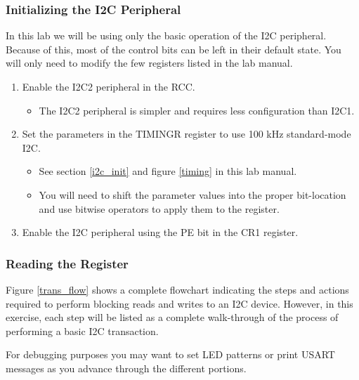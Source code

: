 \documentclass[11pt,fleqn]{book} %
\begin{document}
\subsubsection{Initializing the I2C Peripheral}
In this lab we will be using only the basic operation of the I2C peripheral. Because of this, most of the control bits can be left in their default state. You will only need to modify the few registers listed in the lab manual. 

\begin{enumerate}
    \item Enable the I2C2 peripheral in the RCC.
    \begin{itemize}
        \item The I2C2 peripheral is simpler and requires less configuration than I2C1.
    \end{itemize}
    \item Set the parameters in the TIMINGR register to use 100 kHz standard-mode I2C. 
    \begin{itemize}
        \item See section \ref{i2c_init} and figure \ref{timing} in this lab manual.
        \item You will need to shift the parameter values into the proper bit-location and use bitwise operators to apply them to the register. 
    \end{itemize}
    \item Enable the I2C peripheral using the PE bit in the CR1 register. 
\end{enumerate}

\subsubsection{Reading the Register}
Figure \ref{trans_flow} shows a complete flowchart indicating the steps and actions required to perform blocking reads and writes to an I2C device. However, in this exercise, each step will be listed as a complete walk-through of the process of performing a basic I2C transaction. 

For debugging purposes you may want to set LED patterns or print USART messages as you advance through the different portions.
\end{document}
